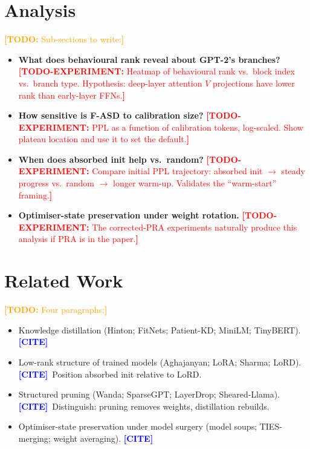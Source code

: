 \documentclass{article}
\newcommand{\todo}[1]{\textcolor{orange}{\textbf{[TODO:} #1\textbf{]}}}
\newcommand{\todoexp}[1]{\textcolor{red}{\textbf{[TODO-EXPERIMENT:} #1\textbf{]}}}
\newcommand{\todocite}{\textcolor{blue}{\textbf{[CITE]}}}
\newcommand{\PPL}{\mathrm{PPL}}
\newcommand{\fasd}{\texorpdfstring{\textsc{F-ASD}}{F-ASD}}
\begin{document}
\section{Analysis}
\label{sec:analysis}
\todo{Sub-sections to write:}
\begin{itemize}[leftmargin=*,nosep]
  \item \textbf{What does behavioural rank reveal about GPT-2's branches?}
        \todoexp{Heatmap of behavioural rank vs.\ block index vs.\ branch type.
        Hypothesis: deep-layer attention $V$ projections have lower rank than
        early-layer FFNs.}
  \item \textbf{How sensitive is \fasd{} to calibration size?}
        \todoexp{$\PPL$ as a function of calibration tokens, log-scaled. Show
        plateau location and use it to set the default.}
  \item \textbf{When does absorbed init help vs.\ random?}
        \todoexp{Compare initial PPL trajectory: absorbed init $\to$ steady
        progress vs.\ random $\to$ longer warm-up. Validates the
        ``warm-start'' framing.}
  \item \textbf{Optimiser-state preservation under weight rotation.}
        \todoexp{The corrected-PRA experiments naturally produce this analysis
        if PRA is in the paper.}
\end{itemize}

\section{Related Work}
\label{sec:rel}
\todo{Four paragraphs:}
\begin{itemize}[leftmargin=*,nosep]
  \item Knowledge distillation (Hinton; FitNets; Patient-KD; MiniLM;
        TinyBERT). \todocite
  \item Low-rank structure of trained models (Aghajanyan; LoRA; Sharma;
        LoRD). \todocite\ Position absorbed init relative to LoRD.
  \item Structured pruning (Wanda; SparseGPT; LayerDrop; Sheared-Llama).
        \todocite\ Distinguish: pruning removes weights, distillation
        rebuilds.
  \item Optimiser-state preservation under model surgery
        (model soups; TIES-merging; weight averaging). \todocite
\end{itemize}
\end{document}
